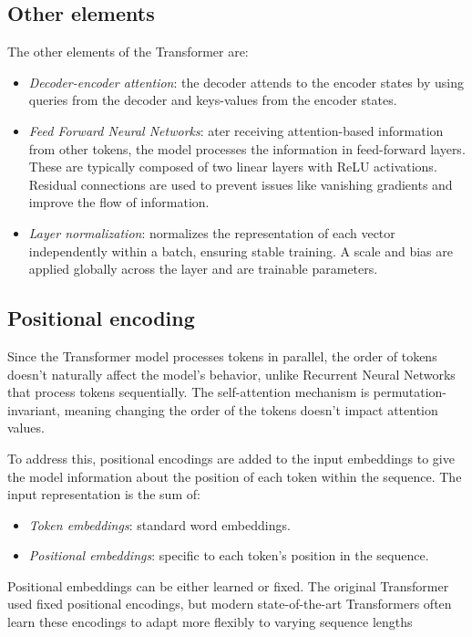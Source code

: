 \subsection{Other elements}
The other elements of the Transformer are: 
\begin{itemize}
    \item \textit{Decoder-encoder attention}: the decoder attends to the encoder states by using queries from the decoder and keys-values from the encoder states.
    \item \textit{Feed Forward Neural Networks}: ater receiving attention-based information from other tokens, the model processes the information in feed-forward layers. 
        These are typically composed of two linear layers with ReLU activations.
        Residual connections are used to prevent issues like vanishing gradients and improve the flow of information.
    \item \textit{Layer normalization}: normalizes the representation of each vector independently within a batch, ensuring stable training.
        A scale and bias are applied globally across the layer and are trainable parameters.
\end{itemize}

\subsection{Positional encoding}
Since the Transformer model processes tokens in parallel, the order of tokens doesn't naturally affect the model's behavior, unlike Recurrent Neural Networks that process tokens sequentially. 
The self-attention mechanism is permutation-invariant, meaning changing the order of the tokens doesn't impact attention values.

To address this, positional encodings are added to the input embeddings to give the model information about the position of each token within the sequence. 
The input representation is the sum of:
\begin{itemize}
    \item \textit{Token embeddings}: standard word embeddings.
    \item \textit{Positional embeddings}: specific to each token's position in the sequence. 
\end{itemize}
Positional embeddings can be either learned or fixed. 
The original Transformer used fixed positional encodings, but modern state-of-the-art Transformers often learn these encodings to adapt more flexibly to varying sequence lengths